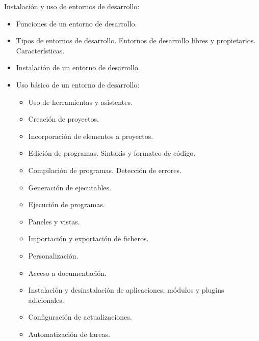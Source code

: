 \documentclass[a4paper]{article}
\begin{document}
Instalación y uso de entornos de desarrollo:
\begin{itemize}
\item Funciones de un entorno de desarrollo.
\item Tipos de entornos de desarrollo. Entornos de desarrollo libres y propietarios. Características.
\item Instalación de un entorno de desarrollo.
\item Uso básico de un entorno de desarrollo:
\begin{itemize}
\item Uso de herramientas y asistentes.
\item Creación de proyectos.
\item Incorporación de elementos a proyectos.
\item Edición de programas. Sintaxis y formateo de código.
\item Compilación de programas. Detección de errores.
\item Generación de ejecutables.
\item Ejecución de programas.
\item Paneles y vistas.
\item Importación y exportación de ficheros.
\item Personalización.
\item Acceso a documentación.
\item Instalación y desinstalación de aplicaciones, módulos y plugins adicionales.
\item Configuración de actualizaciones.
\item Automatización de tareas.
\end{itemize}
\end{itemize}
\end{document}
